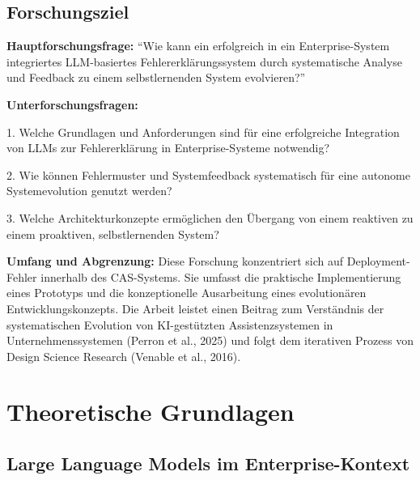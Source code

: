 \documentclass[
  a4paper,
  12pt,
  oneside,
  open=any,
  BCOR=12mm,
  DIV=14,
  parskip=half*,
  headsepline,
  footsepline,
  pointlessnumbers,
  liststotoc,
  numbers=noenddot,
  listof=totoc]{scrartcl}
\begin{document}
\subsection{Forschungsziel}\label{forschungsziel}

\textbf{Hauptforschungsfrage:} ``Wie kann ein erfolgreich in ein
Enterprise-System integriertes LLM-basiertes Fehlererklärungssystem
durch systematische Analyse und Feedback zu einem selbstlernenden System
evolvieren?''

\textbf{Unterforschungsfragen:}

1. Welche Grundlagen und Anforderungen sind für eine erfolgreiche
Integration von LLMs zur Fehlererklärung in Enterprise-Systeme
notwendig?

2. Wie können Fehlermuster und Systemfeedback systematisch für eine
autonome Systemevolution genutzt werden?

3. Welche Architekturkonzepte ermöglichen den Übergang von einem
reaktiven zu einem proaktiven, selbstlernenden System?

\textbf{Umfang und Abgrenzung:} Diese Forschung konzentriert sich auf
Deployment-Fehler innerhalb des CAS-Systems. Sie umfasst die praktische
Implementierung eines Prototyps und die konzeptionelle Ausarbeitung
eines evolutionären Entwicklungskonzepts. Die Arbeit leistet einen
Beitrag zum Verständnis der systematischen Evolution von KI-gestützten
Assistenzsystemen in Unternehmenssystemen (Perron et al., 2025) und
folgt dem iterativen Prozess von Design Science Research (Venable et
al., 2016).

\section{Theoretische Grundlagen}\label{theoretische-grundlagen}

\subsection{Large Language Models im
Enterprise-Kontext}\label{large-language-models-im-enterprise-kontext}
\end{document}
